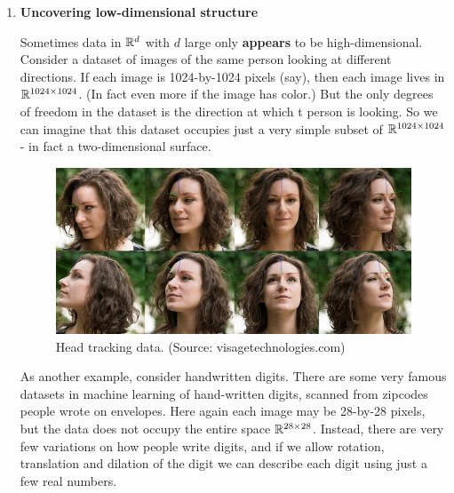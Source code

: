 \begin{enumerate}
  \item {\bf Uncovering low-dimensional structure}

    Sometimes data in $\mathbb{R}^d$ with $d$ large only {\bf appears} to be high-dimensional. Consider a dataset of
    images of the same person looking at different directions. If each image is
    1024-by-1024 pixels (say), then each image lives in $\mathbb{R}^{1024\times 1024}$. (In fact
    even more if the image has color.) 
    But the only degrees of freedom in the dataset is the direction at which t
    person is looking. So we can imagine that this dataset occupies just a 
    very simple subset of $\mathbb{R}^{1024\times 1024}$ - in fact a two-dimensional surface.

    \begin{figure}[H]
      \centering
      \includegraphics[width=4.5in]{headtrack.jpg}  
          \caption{Head tracking data. (Source: visagetechnologies.com)}
    \end{figure}

    As another example, consider handwritten digits. There are some very famous
    datasets in machine learning of hand-written digits, scanned from 
    zipcodes people wrote on envelopes. Here again each image may be
    28-by-28 pixels, but the data does not occupy the entire space 
    $\mathbb{R}^{28\times 28}$. Instead, there are very few variations on how people write
    digits, and if we allow rotation, translation and dilation of the digit we
    can describe each digit using just a few real numbers. 


\end{enumerate}

